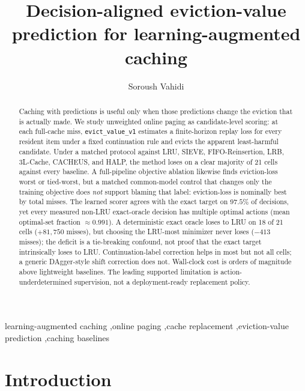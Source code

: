 \documentclass[preprint,12pt]{elsarticle}
\begin{document}
\begin{frontmatter}

\title{Decision-aligned eviction-value prediction for learning-augmented caching}

\author[label1]{Soroush Vahidi}


\begin{abstract}
Caching with predictions is useful only when those predictions change the eviction that is actually made. We study unweighted online paging as candidate-level scoring: at each full-cache miss, \texttt{evict\_value\_v1} estimates a finite-horizon replay loss for every resident item under a fixed continuation rule and evicts the apparent least-harmful candidate. Under a matched protocol against LRU, SIEVE, FIFO-Reinsertion, LRB, 3L-Cache, CACHEUS, and HALP, the method loses on a clear majority of 21 cells against every baseline. A full-pipeline objective ablation likewise finds eviction-loss worst or tied-worst, but a matched common-model control that changes only the training objective does \emph{not} support blaming that label: eviction-loss is nominally best by total misses. The learned scorer agrees with the exact target on $97.5\%$ of decisions, yet every measured non-LRU exact-oracle decision has multiple optimal actions (mean optimal-set fraction $\approx 0.991$). A deterministic exact oracle loses to LRU on 18 of 21 cells ($+81{,}750$ misses), but choosing the LRU-most minimizer never loses ($-413$ misses); the deficit is a tie-breaking confound, not proof that the exact target intrinsically loses to LRU. Continuation-label correction helps in most but not all cells; a generic DAgger-style shift correction does not. Wall-clock cost is orders of magnitude above lightweight baselines. The leading supported limitation is action-underdetermined supervision, not a deployment-ready replacement policy.
\end{abstract}

\begin{keyword}
learning-augmented caching \sep online paging \sep cache replacement \sep eviction-value prediction \sep caching baselines
\end{keyword}
\end{frontmatter}

\section{Introduction}
\label{sec:introduction}
\end{document}
